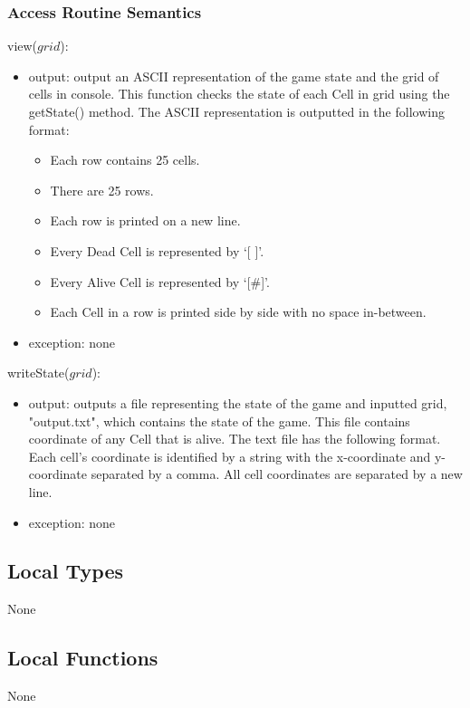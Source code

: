 \documentclass[12pt]{article}
\begin{document}
\subsubsection* {Access Routine Semantics}

\noindent view($grid$):
\begin{itemize}
\item output: 
output an ASCII representation of the game state and the grid of cells in console. This function checks the state of each Cell in grid using the getState() method. The ASCII representation is outputted in the following format:
    \begin{itemize}
        \item Each row contains 25 cells.
        \item There are 25 rows.
        \item Each row is printed on a new line.
        \item Every Dead Cell is represented by `[ ]'.
        \item Every Alive Cell is represented by `[\#]'.
        \item Each Cell in a row is printed side by side with no space in-between.
    \end{itemize}
\item exception: none
\end{itemize}

\noindent writeState($grid$):
\begin{itemize}
\item output: 
outputs a file representing the state of the game and inputted grid, "output.txt", which contains the state of the game. This file contains coordinate of any Cell that is alive. The text file has the following format.  Each cell’s coordinate is identified by a string with the x-coordinate and y-coordinate separated by a comma.  All cell coordinates are separated by a new line.
\item exception: none
\end{itemize}

\subsection*{Local Types}
None

\subsection*{Local Functions}
None

\newpage
\end{document}
